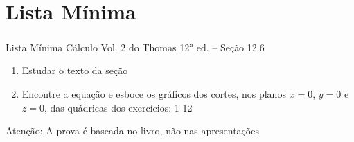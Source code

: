 \documentclass[fleqn,utf8,aspectratio=169,12pt,ignorenonframetext]{beamer}
\begin{document}

\section{Lista Mínima}

\begin{frame}{Lista Mínima}
  Cálculo Vol. 2 do Thomas 12\textsuperscript{a} ed. -- Seção 12.6
  \begin{enumerate}
    \item Estudar o texto da seção
    \item Encontre a equação e esboce os gráficos dos cortes,
          nos planos $x=0$, $y=0$ e $z=0$, das quádricas dos exercícios: 1-12
  \end{enumerate}

  \vfill
  Atenção: A prova é baseada no livro, não nas apresentações
\end{frame}

\end{document}
